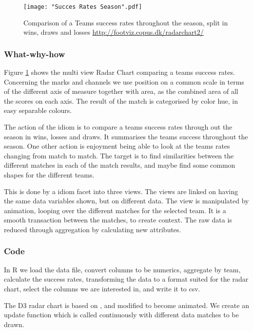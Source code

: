 \documentclass[Report.tex]{subfiles}
\begin{document}
\begin{figure}
\center
\texttt{[image: "Succes Rates Season".pdf]}
\caption{Comparison of a Teams success rates throughout the season, split in wins, draws and losses \url{http://footviz.copus.dk/radarchart2/}}
\label{Fig:CC}
\end{figure}


\subsubsection{What-why-how}
Figure \ref{Fig:CC} shows the multi view Radar Chart comparing a teams success rates. Concerning the marks and channels we use position on a common scale in terms of the different axis of measure together with area, as the combined area of all the scores on each axis. The result of the match is categorised by color hue, in easy separable colours.  

The action of the idiom is to compare a teams success rates through out the season in wins, losses and draws. It summarises the teams success throughout the season. One other action is enjoyment being able to look at the teams rates changing from match to match.
The target is to find similarities between the different matches in each of the match results, and maybe find some common shapes for the different teams.

This is done by a idiom facet into three views. The views are linked on having the same data variables shown, but on different data. The view is manipulated by animation, looping over the different matches for the selected team. It is a smooth transaction between the matches, to create context. The raw data is reduced through aggregation by calculating new attributes.

\subsubsection{Code}
In R we load the data file, convert columns to be numerics, aggregate by team, calculate the success rates, transforming the data to a format suited for the radar chart, select the columns we are interested in, and write it to csv.

The D3 radar chart is based on \cite{Radar}, and modified to become animated. We create an update function which is called continuously with different data matches to be drawn. 
\end{document}
